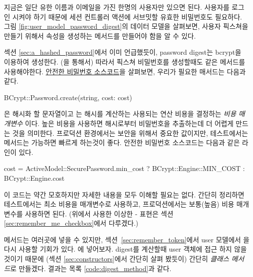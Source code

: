 지금은 일단 유한 이름과 이메일을 가진 한명의 사용자만 있으면 된다. 사용자를 로그인 시켜야 하기 때문에 세션 컨트롤러  액션에 서브밋할 유효한 비밀번호도 필요하다. 그림 \ref{fig:user_model_password_digest}의 데이터 모델을 살펴보면, 사용자 픽스쳐을 만들기 위해서  속성을 생성하는  메서드를 만들어야 함을 알 수 있다. 

섹션 \ref{sec:a_hashed_password}에서 이미 언급했듯이, password digest는 bcrypt을 이용하여 생성한다. (을 통해서) 따라서 픽스쳐 비밀번호를 생성할때도 같은 메서드를 사용해야한다. \href{https://github.com/rails/rails/blob/master/activemodel/lib/active_model/secure_password.rb}{안전한 비밀번호 소스코드}을 살펴보면, 우리가 필요한 매서드는 다음과 같다. 

\begin{code} BCrypt::Password.create(string, cost: cost) \end{code} 

\noindent {}은 해시화 할 문자열이고  는 해시를 계산하는 사용되는 연산 비용을 결정하는 \emph{비용 매개변수 }이다. 높은 비용을 사용하면 해시로부터 비밀번호을 추출하는데 더 어렵게 만드는 것을 의미한다. 프로덕션 환경에서는 보안을 위해서 중요한 값이지만, 테스트에서는  메서드는 가능하면 빠르게 하는것이 좋다. 안전한 비밀번호 소스코드는 다음과 같은 라인이 있다. 

\begin{code} cost = ActiveModel::SecurePassword.min_cost ? BCrypt::Engine::MIN_COST : BCrypt::Engine.cost \end{code} 

\noindent 이 코드는 약간 모호하지만 자세한 내용을 모두 이해할 필요는 없다. 간단히 정리하면 테스트에서는 최소 비용을 매개변수로 사용하고, 프로덕션에서는 보통(높음) 비용 매개변수를 사용하면 된다. (위에서 사용한 이상한 -\kode{:} 표현은 섹션 \ref{sec:remember_me_checkbox}에서 다루겠다.) 

 메서드는 여러곳에 넣을 수 있지만, 섹션~\ref{sec:remember_token}에서 user 모델에서  을 다시 사용할 기회가 있다. 에 넣어보자. digest를 계산할때 user 객체에 접근 하지 않을 것이기 때문에 (섹션 \ref{sec:constructors}에서 간단히 살펴 봤듯이) 간단히 \emph{클래스 메서드}로 만들겠다. 결과는 목록 \ref{code:digest_method}과 같다. 

